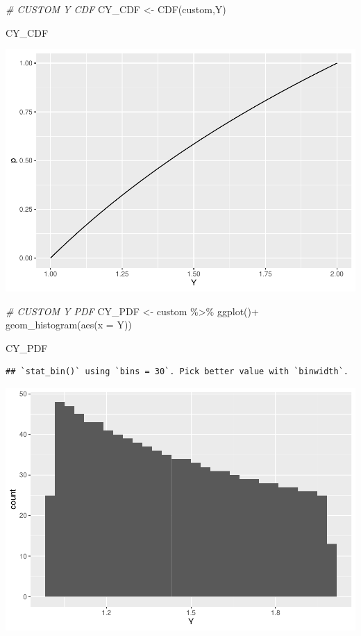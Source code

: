 \documentclass[
]{article}
\newenvironment{Shaded}{\begin{snugshade}}{\end{snugshade}}
\newcommand{\AttributeTok}[1]{\textcolor[rgb]{0.77,0.63,0.00}{#1}}
\newcommand{\CommentTok}[1]{\textcolor[rgb]{0.56,0.35,0.01}{\textit{#1}}}
\newcommand{\FunctionTok}[1]{\textcolor[rgb]{0.00,0.00,0.00}{#1}}
\newcommand{\NormalTok}[1]{#1}
\newcommand{\OtherTok}[1]{\textcolor[rgb]{0.56,0.35,0.01}{#1}}
\newcommand{\SpecialCharTok}[1]{\textcolor[rgb]{0.00,0.00,0.00}{#1}}
\begin{document}
\begin{Shaded}
\begin{Highlighting}[]
\CommentTok{\# CUSTOM Y CDF}
\NormalTok{CY\_CDF }\OtherTok{\textless{}{-}} \FunctionTok{CDF}\NormalTok{(custom,Y)}

\NormalTok{CY\_CDF}
\end{Highlighting}
\end{Shaded}

\includegraphics{HW-3_files/figure-latex/unnamed-chunk-2-3.pdf}

\begin{Shaded}
\begin{Highlighting}[]
\CommentTok{\# CUSTOM Y PDF}
\NormalTok{CY\_PDF }\OtherTok{\textless{}{-}}\NormalTok{ custom }\SpecialCharTok{\%\textgreater{}\%} 
  \FunctionTok{ggplot}\NormalTok{()}\SpecialCharTok{+}
  \FunctionTok{geom\_histogram}\NormalTok{(}\FunctionTok{aes}\NormalTok{(}\AttributeTok{x =}\NormalTok{ Y))}

\NormalTok{CY\_PDF}
\end{Highlighting}
\end{Shaded}

\begin{verbatim}
## `stat_bin()` using `bins = 30`. Pick better value with `binwidth`.
\end{verbatim}

\includegraphics{HW-3_files/figure-latex/unnamed-chunk-2-4.pdf}
\end{document}
